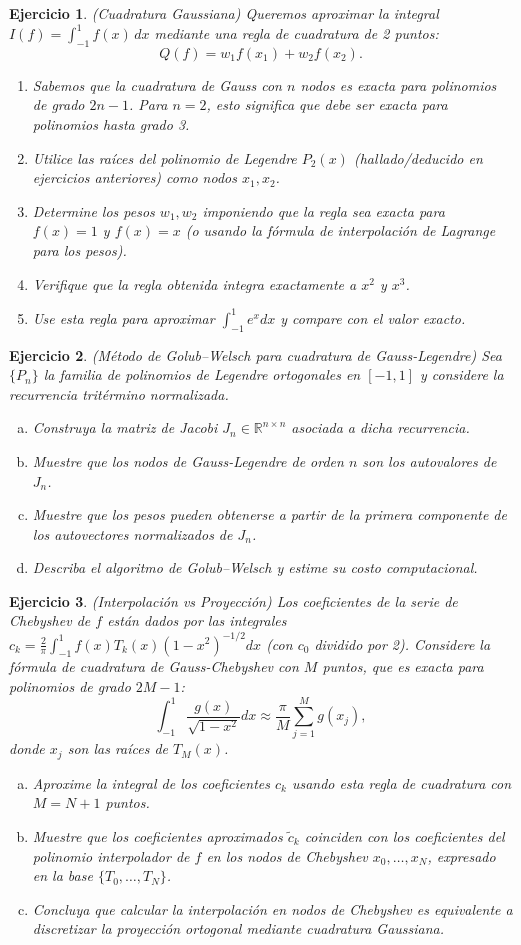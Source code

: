 \documentclass[12pt]{article}
\newtheorem{exercise}{Ejercicio}
\newcommand{\bej}{\begin{exercise}\rm}
\newcommand{\fej}{\end{exercise}}
\begin{document}
\bej
(Cuadratura Gaussiana)
Queremos aproximar la integral $I(f) = \int_{-1}^1 f(x)\,dx$ mediante una regla de cuadratura de 2 puntos:
\[
Q(f) = w_1 f(x_1) + w_2 f(x_2).
\]
\begin{enumerate}
    \item Sabemos que la cuadratura de Gauss con $n$ nodos es exacta para polinomios de grado $2n-1$. Para $n=2$, esto significa que debe ser exacta para polinomios hasta grado 3.
    \item Utilice las raíces del polinomio de Legendre $P_2(x)$ (hallado/deducido en ejercicios anteriores) como nodos $x_1, x_2$.
    \item Determine los pesos $w_1, w_2$ imponiendo que la regla sea exacta para $f(x)=1$ y $f(x)=x$ (o usando la fórmula de interpolación de Lagrange para los pesos).
    \item Verifique que la regla obtenida integra exactamente a $x^2$ y $x^3$.
    \item Use esta regla para aproximar $\int_{-1}^1 e^x dx$ y compare con el valor exacto.
\end{enumerate}
\fej

\bej
(Método de Golub--Welsch para cuadratura de Gauss-Legendre)
Sea $\{P_n\}$ la familia de polinomios de Legendre ortogonales en $[-1,1]$ y considere la recurrencia tritérmino normalizada.
\begin{enumerate}[(a)]
    \item Construya la matriz de Jacobi $J_n\in\mathbb R^{n\times n}$ asociada a dicha recurrencia.
    \item Muestre que los nodos de Gauss-Legendre de orden $n$ son los autovalores de $J_n$.
    \item Muestre que los pesos pueden obtenerse a partir de la primera componente de los autovectores normalizados de $J_n$.
    \item Describa el algoritmo de Golub--Welsch y estime su costo computacional.
\end{enumerate}
\fej


\bej
(Interpolación vs Proyección)
Los coeficientes de la serie de Chebyshev de $f$ están dados por las integrales $c_k = \frac{2}{\pi} \int_{-1}^1 f(x) T_k(x) (1-x^2)^{-1/2} dx$ (con $c_0$ dividido por 2).
Considere la fórmula de cuadratura de Gauss-Chebyshev con $M$ puntos, que es exacta para polinomios de grado $2M-1$:
\[ \int_{-1}^1 \frac{g(x)}{\sqrt{1-x^2}} dx \approx \frac{\pi}{M} \sum_{j=1}^M g(x_j), \]
donde $x_j$ son las raíces de $T_M(x)$.
\begin{enumerate}[(a)]
    \item Aproxime la integral de los coeficientes $c_k$ usando esta regla de cuadratura con $M=N+1$ puntos.
    \item Muestre que los coeficientes aproximados $\tilde{c}_k$ coinciden con los coeficientes del polinomio interpolador de $f$ en los nodos de Chebyshev $x_0, \dots, x_N$, expresado en la base $\{T_0, \dots, T_N\}$.
    \item Concluya que calcular la interpolación en nodos de Chebyshev es equivalente a discretizar la proyección ortogonal mediante cuadratura Gaussiana.
\end{enumerate}
\fej
\end{document}
